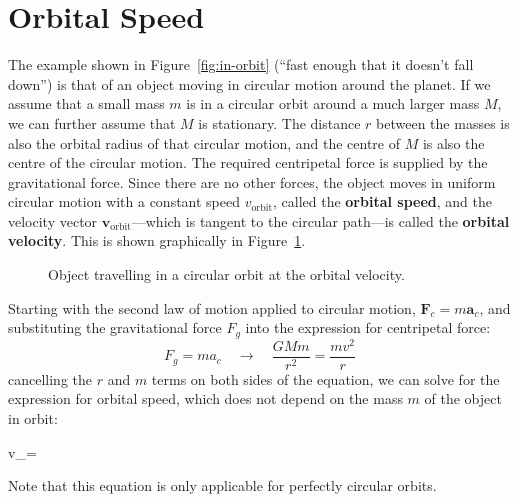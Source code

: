 \section{Orbital Speed}
\label{sec:orbital-speed}
The example shown in Figure~\ref{fig:in-orbit} (``fast enough that it doesn't
fall down'') is that of an object moving in circular motion around the planet.
If we assume that a small mass $m$ is in a circular orbit around a much larger
mass $M$, we can further assume that $M$ is stationary. The distance $r$
between the masses is also the orbital radius of that circular motion, and the
centre of $M$ is also the centre of the circular motion. The required centripetal
force is supplied by the gravitational force. Since there are no other forces,
the object moves in uniform circular motion with a constant speed
$v_\text{orbit}$, called the \textbf{orbital speed}, and the velocity vector
$\bm v_\text{orbit}$---which is tangent to the circular path---is called the
\textbf{orbital velocity}. This is shown graphically in
Figure~\ref{fig:orbital-velocity}.
\begin{figure}[ht]
  \centering
  \caption{Object travelling in a circular orbit at the orbital velocity.}
  \label{fig:orbital-velocity}
\end{figure}

Starting with the second law of motion applied to circular motion,
$\bm F_c=m\bm a_c$, and substituting the gravitational force $F_g$ into
the expression for centripetal force:
\begin{equation}
  F_g=ma_c\quad\longrightarrow\quad \frac{GMm}{r^2}=\frac{mv^2}r
\end{equation}
cancelling the $r$ and $m$ terms on both sides of the equation, we can solve
for the expression for orbital speed, which does not depend on the mass $m$
of the object in orbit:
\begin{important-equation}
  v_=
  \label{eq:orbital-speed}
\end{important-equation}
Note that this equation is only applicable for perfectly circular orbits.



